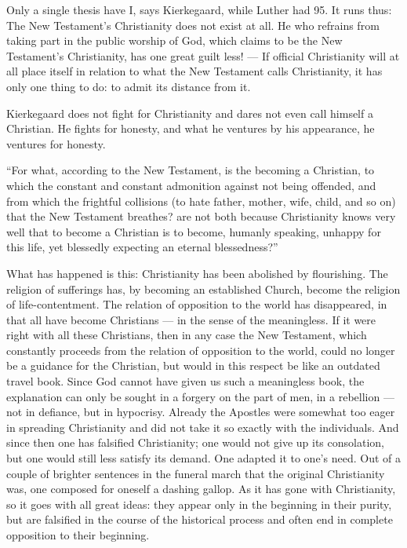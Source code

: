 \documentclass[12pt,a4paper]{book}
\newcommand{\opage}[1]{\marginnote{\footnotesize\textit{[#1]}}}
\begin{document}
Only a single thesis have I, says Kierkegaard, while Luther had 95. It runs thus: The New
Testament's Christianity does not exist at all. He who refrains from taking part in the public
worship of God, which claims to be the New Testament's Christianity, has one great guilt less! ---
If official Christianity will at all place itself in relation to what the New Testament calls
Christianity, it has only one thing to do: to admit its distance from it.

Kierkegaard does not fight for Christianity and dares not even call himself a Christian. He fights
for honesty, and \opage{169}what he ventures by his appearance, he ventures for honesty.

``For what, according to the New Testament, is the becoming a Christian, to which the constant and
constant admonition against not being offended, and from which the frightful collisions (to hate
father, mother, wife, child, and so on) that the New Testament breathes? are not both because
Christianity knows very well that to become a Christian is to become, humanly speaking, unhappy for
this life, yet blessedly expecting an eternal blessedness?''

What has happened is this: Christianity has been abolished by flourishing. The religion of
sufferings has, by becoming an established Church, become the religion of life-contentment. The
relation of opposition to the world has disappeared, in that all have become Christians --- in the
sense of the meaningless. If it were right with all these Christians, then in any case the New
Testament, which constantly proceeds from the relation of opposition to the world, could no longer
be a guidance for the Christian, but would in this respect be like an outdated travel book. Since
God cannot have given us such a meaningless book, the explanation can only be sought in a forgery
on the part of men, in a rebellion --- not in defiance, but in hypocrisy. Already the Apostles were
somewhat too eager in spreading Christianity and did not take it so exactly with the individuals.
And since then one has falsified Christianity; one would not give up its consolation, but one would
still less satisfy its demand. One adapted it to one's need. Out of a couple of brighter sentences
in the funeral march that the original Christianity was, one composed for oneself a dashing gallop.
As it has gone with Christianity, so it goes with all great ideas: they appear only in the
beginning in their purity, but are falsified in the course of the historical process and often end
in complete opposition to their beginning.
\end{document}

